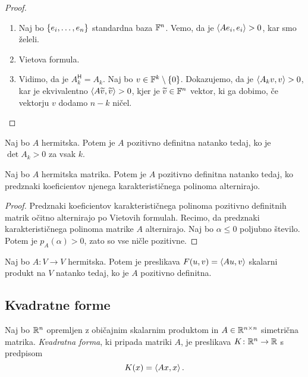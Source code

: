 \documentclass[12pt, a4paper]{article}
\begin{document}
\begin{proof}\phantom{.}
\begin{enumerate}
\item Naj bo $\left\{e_i,\dots,e_n\right\}$ standardna baza $\mathbb{F}^n$. Vemo, da je $\left\langle Ae_i,e_i\right\rangle>0$, kar smo želeli.
\item Vietova formula.
\item Vidimo, da je $A_k^\mathsf{H}=A_k$. Naj bo $v\in\mathbb{F}^k\setminus\left\{0\right\}$. Dokazujemo, da je $\left\langle A_kv,v\right\rangle>0$, kar je ekvivalentno $\left\langle A\widetilde{v},\widetilde{v}\right\rangle>0$, kjer je $\widetilde{v}\in\mathbb{F}^n$ vektor, ki ga dobimo, če vektorju $v$ dodamo $n-k$ ničel.\qedhere
\end{enumerate}
\end{proof}

\begin{trditev}
Naj bo $A$ hermitska. Potem je $A$ pozitivno definitna natanko tedaj, ko je $\det A_k>0$ za vsak $k$.
\end{trditev}

\begin{izrek}
Naj bo $A$ hermitska matrika. Potem je $A$ pozitivno definitna natanko tedaj, ko predznaki koeficientov njenega karakterističnega polinoma alternirajo.
\end{izrek}

\begin{proof}
Predznaki koeficientov karakterističnega polinoma pozitivno definitnih matrik očitno alternirajo po Vietovih formulah. Recimo, da predznaki karakterističnega polinoma matrike $A$ alternirajo. Naj bo $\alpha\leq 0$ poljubno število. Potem je $p_A(\alpha)>0$, zato so vse ničle pozitivne.
\end{proof}

\begin{trditev}
Naj bo $A\colon V\to V$ hermitska. Potem je preslikava $F(u,v)=\left\langle Au,v\right\rangle$ skalarni produkt na $V$ natanko tedaj, ko je $A$ pozitivno definitna.
\end{trditev}

\obvs

\newpage

\subsection{Kvadratne forme}

\begin{okvir}
\begin{definicija}
Naj bo $\mathbb{R}^n$ opremljen z običajnim skalarnim produktom in $A\in\mathbb{R}^{n\times n}$ simetrična matrika. \emph{Kvadratna forma}, ki pripada matriki $A$, je preslikava $K\colon\mathbb{R}^n\to\mathbb{R}$ s predpisom
\[
K(x)=\left\langle Ax,x\right\rangle.
\]
\end{definicija}
\end{okvir}
\end{document}
